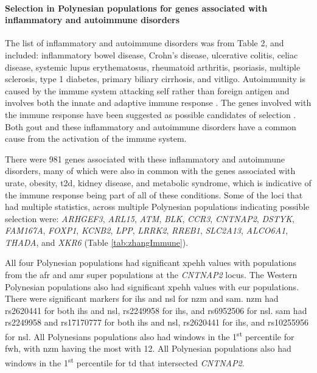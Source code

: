 \documentclass[]{report}
\let\oldparagraph\paragraph
\renewcommand{\paragraph}[1]{\oldparagraph{#1}\mbox{}}
\begin{document}
\endgroup{}

\paragraph{Selection in Polynesian populations for genes associated with
inflammatory and autoimmune
disorders}\label{selection-in-polynesian-populations-for-genes-associated-with-inflammatory-and-autoimmune-disorders}

The list of inflammatory and autoimmune disorders was from
\citet{Zhang2013a} Table 2, and included: inflammatory bowel disease,
Crohn's disease, ulcerative colitis, celiac disease, systemic lupus
erythematosus, rheumatoid arthritis, psoriasis, multiple sclerosis, type
1 diabetes, primary biliary cirrhosis, and vitligo. Autoimmunity is
caused by the immune system attacking self rather than foreign antigen
and involves both the innate and adaptive immune response
\citep{Waldner2009}. The genes involved with the immune response have
been suggested as possible candidates of selection \citep{Grossman2013}.
Both gout and these inflammatory and autoimmune disorders have a common
cause from the activation of the immune system.

There were 981 genes associated with these inflammatory and autoimmune
disorders, many of which were also in common with the genes associated
with urate, obesity, \gls{t2d}, kidney disease, and metabolic syndrome,
which is indicative of the immune response being part of all of these
conditions. Some of the loci that had multiple statistics, across
multiple Polynesian populations indicating possible selection were:
\emph{ARHGEF3}, \emph{ARL15}, \emph{ATM}, \emph{BLK}, \emph{CCR3},
\emph{CNTNAP2}, \emph{DSTYK}, \emph{FAM167A}, \emph{FOXP1},
\emph{KCNB2}, \emph{LPP}, \emph{LRRK2}, \emph{RREB1}, \emph{SLC2A13},
\emph{ALCO6A1}, \emph{THADA}, and \emph{XKR6} (Table
\ref{tab:zhangImmune}).

All four Polynesian populations had significant \gls{xpehh} values with
populations from the \gls{afr} and \gls{amr} super populations at the
\emph{CNTNAP2} locus. The Western Polynesian populations also had
significant \gls{xpehh} values with \gls{eur} populations. There were
significant markers for \gls{ihs} and \gls{nsl} for \gls{nzm} and
\gls{sam}. \Gls{nzm} had rs2620441 for both \gls{ihs} and \gls{nsl},
rs2249958 for \gls{ihs}, and rs6952506 for \gls{nsl}. \Gls{sam} had
rs2249958 and rs17170777 for both \gls{ihs} and \gls{nsl}, rs2620441 for
\gls{ihs}, and rs10255956 for \gls{nsl}. All Polynesians populations
also had windows in the 1\textsuperscript{st} percentile for \gls{fwh},
with \gls{nzm} having the most with 12. All Polynesian populations also
had windows in the 1\textsuperscript{st} percentile for \gls{td} that
intersected \emph{CNTNAP2}.
\end{document}
